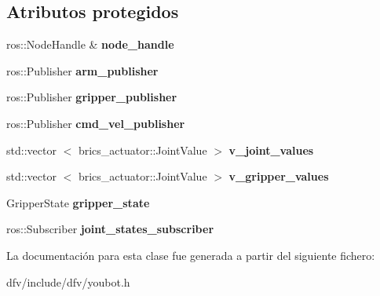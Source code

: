 \subsection*{\-Atributos protegidos}
\begin{DoxyCompactItemize}
\item 
\hypertarget{classdfv_1_1Youbot_ac933160ab53585f288cc799b52f69a68}{ros\-::\-Node\-Handle \& {\bfseries node\-\_\-handle}}\label{classdfv_1_1Youbot_ac933160ab53585f288cc799b52f69a68}

\item 
\hypertarget{classdfv_1_1Youbot_a3e7e06d117f2f78eb27cffdb62bc7693}{ros\-::\-Publisher {\bfseries arm\-\_\-publisher}}\label{classdfv_1_1Youbot_a3e7e06d117f2f78eb27cffdb62bc7693}

\item 
\hypertarget{classdfv_1_1Youbot_a33b95ba16f704b706f691b87ed954425}{ros\-::\-Publisher {\bfseries gripper\-\_\-publisher}}\label{classdfv_1_1Youbot_a33b95ba16f704b706f691b87ed954425}

\item 
\hypertarget{classdfv_1_1Youbot_a02be5b55094854fc9113bdf722ebf53f}{ros\-::\-Publisher {\bfseries cmd\-\_\-vel\-\_\-publisher}}\label{classdfv_1_1Youbot_a02be5b55094854fc9113bdf722ebf53f}

\item 
\hypertarget{classdfv_1_1Youbot_a6bb0b4af437162dc72b5d266c316ad5a}{std\-::vector\*
$<$ brics\-\_\-actuator\-::\-Joint\-Value $>$ {\bfseries v\-\_\-joint\-\_\-values}}\label{classdfv_1_1Youbot_a6bb0b4af437162dc72b5d266c316ad5a}

\item 
\hypertarget{classdfv_1_1Youbot_a278c101488612b9e4b2f3ed4dc6d6d47}{std\-::vector\*
$<$ brics\-\_\-actuator\-::\-Joint\-Value $>$ {\bfseries v\-\_\-gripper\-\_\-values}}\label{classdfv_1_1Youbot_a278c101488612b9e4b2f3ed4dc6d6d47}

\item 
\hypertarget{classdfv_1_1Youbot_aeffb78d0de972814aeab8e7ff7841f53}{\-Gripper\-State {\bfseries gripper\-\_\-state}}\label{classdfv_1_1Youbot_aeffb78d0de972814aeab8e7ff7841f53}

\item 
\hypertarget{classdfv_1_1Youbot_ae48d141f16468e936180d6de7fee2ec0}{ros\-::\-Subscriber {\bfseries joint\-\_\-states\-\_\-subscriber}}\label{classdfv_1_1Youbot_ae48d141f16468e936180d6de7fee2ec0}

\end{DoxyCompactItemize}


\-La documentación para esta clase fue generada a partir del siguiente fichero\-:\begin{DoxyCompactItemize}
\item 
dfv/include/dfv/youbot.\-h\end{DoxyCompactItemize}
